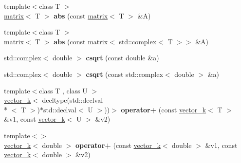 \begin{DoxyCompactItemize}
\item 
\hypertarget{namespacekeycpp_a1f83b48bfedf753904dfea9dde554a4c}{{\footnotesize template$<$class T $>$ }\\\hyperlink{classkeycpp_1_1matrix}{matrix}$<$ T $>$ {\bfseries abs} (const \hyperlink{classkeycpp_1_1matrix}{matrix}$<$ T $>$ \&A)}\label{namespacekeycpp_a1f83b48bfedf753904dfea9dde554a4c}

\item 
\hypertarget{namespacekeycpp_ae0edec63f48a81c576da0c0ffc768af9}{{\footnotesize template$<$class T $>$ }\\\hyperlink{classkeycpp_1_1matrix}{matrix}$<$ T $>$ {\bfseries abs} (const \hyperlink{classkeycpp_1_1matrix}{matrix}$<$ std\-::complex$<$ T $>$$>$ \&A)}\label{namespacekeycpp_ae0edec63f48a81c576da0c0ffc768af9}

\item 
\hypertarget{namespacekeycpp_a952e5296774667c3be4e792b5cd980da}{std\-::complex$<$ double $>$ {\bfseries csqrt} (const double \&a)}\label{namespacekeycpp_a952e5296774667c3be4e792b5cd980da}

\item 
\hypertarget{namespacekeycpp_a8faa7912f1f198c5185cb6a36cfd2fb2}{std\-::complex$<$ double $>$ {\bfseries csqrt} (const std\-::complex$<$ double $>$ \&a)}\label{namespacekeycpp_a8faa7912f1f198c5185cb6a36cfd2fb2}

\item 
\hypertarget{namespacekeycpp_aa865f0bd18bdefcf413b1c3dd286b998}{{\footnotesize template$<$class T , class U $>$ }\\\hyperlink{classkeycpp_1_1vector__k}{vector\-\_\-k}$<$ decltype(std\-::declval\\*
$<$ T $>$)$\ast$std\-::declval$<$ U $>$))$>$ {\bfseries operator+} (const \hyperlink{classkeycpp_1_1vector__k}{vector\-\_\-k}$<$ T $>$ \&v1, const \hyperlink{classkeycpp_1_1vector__k}{vector\-\_\-k}$<$ U $>$ \&v2)}\label{namespacekeycpp_aa865f0bd18bdefcf413b1c3dd286b998}

\item 
\hypertarget{namespacekeycpp_ae416b3cc307c30afdb62f0ed37b70e05}{{\footnotesize template$<$$>$ }\\\hyperlink{classkeycpp_1_1vector__k}{vector\-\_\-k}$<$ double $>$ {\bfseries operator+} (const \hyperlink{classkeycpp_1_1vector__k}{vector\-\_\-k}$<$ double $>$ \&v1, const \hyperlink{classkeycpp_1_1vector__k}{vector\-\_\-k}$<$ double $>$ \&v2)}\label{namespacekeycpp_ae416b3cc307c30afdb62f0ed37b70e05}


\end{DoxyCompactItemize}
